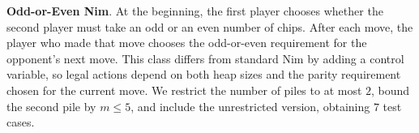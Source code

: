 \documentclass[review]{elsarticle}
\newcommand{\set}[1]{\{ #1 \}}
\newcommand{\tuple}[1]{\langle {#1} \rangle}
\newcommand{\true}{\top}
\newcommand{\statevar}{\mathcal{X}}
\newcommand{\act}{\mathcal{A}}
\newcommand{\constraint}{\mathcal{C}}
\newcommand{\estate}{\mathcal{E}}
\newcommand{\pre}{\mathtt{pre}}
\newcommand{\eff}{\mathtt{eff}}
\newcommand{\modulo}{\equiv}
\begin{document}
\textbf{Odd-or-Even Nim}. At the beginning, the first player chooses whether the second player must take an odd or an even number of chips.
After each move, the player who made that move chooses the odd-or-even requirement for the opponent's next move.
This class differs from standard Nim by adding a control variable, so legal actions depend on both heap sizes and the parity requirement chosen for the current move.
We restrict the number of piles to at most $2$, bound the second pile by $m \le 5$, and include the unrestricted version, obtaining $7$ test cases.
\end{document}
